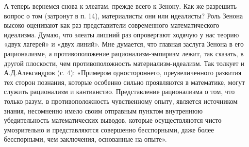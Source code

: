 А  теперь  вернемся  снова  к  элеатам, прежде  всего  к  Зенону.  Как
же  разрешить  вопрос о  том  (затронут  в  п. 14),  материалисты  они
или  идеалисты? Роль  Зенона  высоко оценивают  как раз  представители
современного математического  идеализма. Думаю, что элеаты  лишний раз
опровергают  ходячую  у нас  теорию  «двух  лагерей» и  «двух  линий».
Мне  думается,  что  главная  заслуга Зенона  в  его  рационализме,  а
противоположение  рационализм-эмпиризм лежит,  так  сказать, в  другой
плоскости, чем  противоположность материализм-идеализм. Так  толкует и
А.Д.Александров  (с.  4):  «Примером  одностороннего,  преувеличенного
развития тех  сторон познания,  которые особенно сильно  проявляются в
математике,  могут служить  рационализм  и кантианство.  Представление
рационализма о том, что только разум, в противоположность чувственному
опыту, является  источником знания,  несомненно имело  своим отправным
пунктом  внутреннюю  убедительность  математических  выводов,  которые
осуществляются   чисто   умозрительно  и   представляются   совершенно
бесспорными,  даже более  бесспорными, чем  заключения, основанные  на
опыте».

